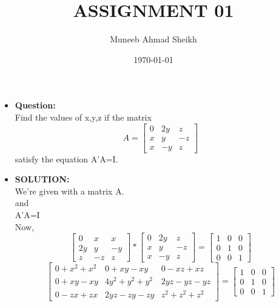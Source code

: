\documentclass{article}
\begin{document}
\title{ASSIGNMENT 01}
\author{Muneeb Ahmad Sheikh}
\date{\today}
\maketitle

\begin{itemize}
\item{\textbf{Question:}}\\

Find the values of x,y,z if the matrix\\
 \[
 A=
 \begin{bmatrix}
  
         0 & 2y & z\\
         x & y & -z\\
         x & -y & z
 \end{bmatrix}
\] satisfy the equation A'A=I.

\item{\textbf{SOLUTION:}}\\

We're given with a matrix A.\\
and\\
A'A=I\\

Now,\\

\[
\begin{bmatrix}
   0 & x & x\\           
   2y & y & -y \\     
   z & -z & z              
 \end{bmatrix} 
      *
 \begin{bmatrix}
         0 & 2y & z\\
         x & y & -z\\
         x & -y & z
 \end{bmatrix}
      = 
 \begin{bmatrix}
         1 & 0 & 0\\
         0 & 1 & 0\\
         0 & 0 & 1
 \end{bmatrix}
\]
\[
\begin{bmatrix}
  0+x^2+x^2 & 0+xy-xy & 0-xz+xz\\
  0+xy-xy   & 4y^2+y^2+y^2 & 2yz-yz-yz\\
  0-zx+zx   & 2yz-zy-zy    & z^2+z^2+z^2
 \end{bmatrix}
 =
 \begin{bmatrix}
         1 & 0 & 0\\
         0 & 1 & 0\\
         0 & 0 & 1
 \end{bmatrix}
 \]
 

\end{itemize}
\end{document}
